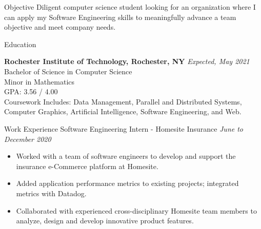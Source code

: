 \documentclass{resume} %
\begin{document}

\begin{rSection}{Objective}
Diligent computer science student looking for an organization where I can apply my Software Engineering skills to
 meaningfully advance a team objective and meet company needs. 
\end{rSection}

\begin{rSection}{Education}

{\bf Rochester Institute of Technology, Rochester, NY} \hfill {\em Expected, May 2021} 
\\ Bachelor of Science in Computer Science
\\ Minor in Mathematics
\\ GPA: 3.56 / 4.00
\\ Coursework Includes:  Data Management, Parallel and Distributed Systems, Computer Graphics, Artificial Intelligence, Software Engineering, and Web.

\end{rSection}


\begin{rSection}{Work Experience} 
Software Engineering Intern - Homesite Insurance \hfill {\em June to December 2020}
\begin{itemize}[noitemsep]
    \item Worked with a team of software engineers to develop and support the insurance e-Commerce platform at
    Homesite.
    \item Added application performance metrics to existing projects; integrated metrics with Datadog.
    \item Collaborated with experienced cross-disciplinary Homesite team members to analyze, design and develop innovative product features.
\end{itemize}
\end{rSection}
\end{document}
